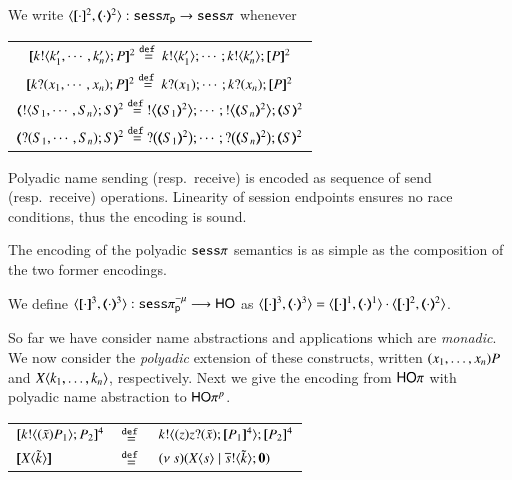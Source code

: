 \begin{definition}
	We write $\encod{\cdot}{\cdot}{2}:\psesp \to \sesp$ whenever

	\begin{tabular}{c}
			$\map{\bout{k}{k'_1, \cdots, k'_n} P}^{2} \defeq \bout{k}{k'_1} \cdots ;  \bout{k}{k'_n}
			\pmap{P}{2}$\\
			$\map{\binp{k}{x_1, \cdots, x_n} P}^{2} \defeq \binp{k}{x_1} \cdots ; \binp{k}{x_n}  \pmap{P}{2}$ \\
			$\tmap{\btout{S_1, \cdots, S_n} S}{2} \defeq \bbtout{\tmap{S_1}{2}} \cdots; \bbtout{\tmap{S_n}{2}} \tmap{S}{2}$\\
			$\tmap{\btinp{S_1, \cdots, S_n} S}{2} \defeq \bbtinp{\tmap{S_1}{2}} \cdots; \bbtinp{\tmap{S_n}{2}} \tmap{S}{2}$
	\end{tabular}
\end{definition}

Polyadic name sending (resp.\ receive) is encoded as sequence of
send (resp.\ receive) operations. Linearity of session endpoints
ensures no race conditions, thus the encoding is sound.

The encoding of the polyadic $\mathtt{sess}\pi$ semantics is as simple as the
composition of the two former encodings.

\begin{definition}
	We define $\encod{\cdot}{\cdot}{3}: \psespnr \longrightarrow \HO$
	as $\encod{\cdot}{\cdot}{3} = \encod{\cdot}{\cdot}{1} \cat \encod{\cdot}{\cdot}{2}$.	
\end{definition}

So far we have consider name abstractions and applications which are \emph{monadic}.
We now consider the \emph{polyadic} extension of these constructs, %
written $(x_1, \ldots, x_n)P$ and $X\langle k_1, \ldots, k_n \rangle$, respectively.
Next we give the encoding from $\mathsf{HO}\pi$ with polyadic name abstraction to $\mathsf{HO}\pi^{p}$.

\begin{definition}

	\begin{tabular}{lcl}
		$[\!\![k ! \langle (\tilde{x})P_1 \rangle ; P_2]\!\!]^4$ &$\stackrel{\mathtt{def}\ }{=}$& $\bout{k}{\abs{z} \binp{z}{\tilde{x}} \map{P_1}^4} \map{P_2}^4$\\
		$[\!\![X\langle \tilde{k} \rangle]\!\!]$ &$\stackrel{\mathtt{def}\ }{=}$& $(\nu\ s)(X\langle s \rangle \;|\; \overline{s} ! \langle \tilde{k} \rangle ; \mathbf{0})$
	\end{tabular}
\end{definition}

